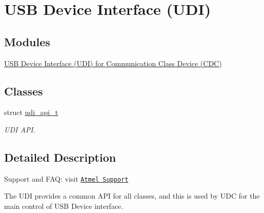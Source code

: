 \hypertarget{group__udi__group}{\section{U\-S\-B Device Interface (U\-D\-I)}
\label{group__udi__group}
}
\subsection*{Modules}
\begin{DoxyCompactItemize}
\item 
\hyperlink{group__udi__cdc__group}{U\-S\-B Device Interface (\-U\-D\-I) for Communication Class Device (\-C\-D\-C)}
\end{DoxyCompactItemize}
\subsection*{Classes}
\begin{DoxyCompactItemize}
\item 
struct \hyperlink{structudi__api__t}{udi\-\_\-api\-\_\-t}
\begin{DoxyCompactList}\small\item\em U\-D\-I A\-P\-I. \end{DoxyCompactList}\end{DoxyCompactItemize}


\subsection{Detailed Description}
Support and F\-A\-Q\-: visit \href{http://www.atmel.com/design-support/}{\tt Atmel Support}

The U\-D\-I provides a common A\-P\-I for all classes, and this is used by U\-D\-C for the main control of U\-S\-B Device interface. 